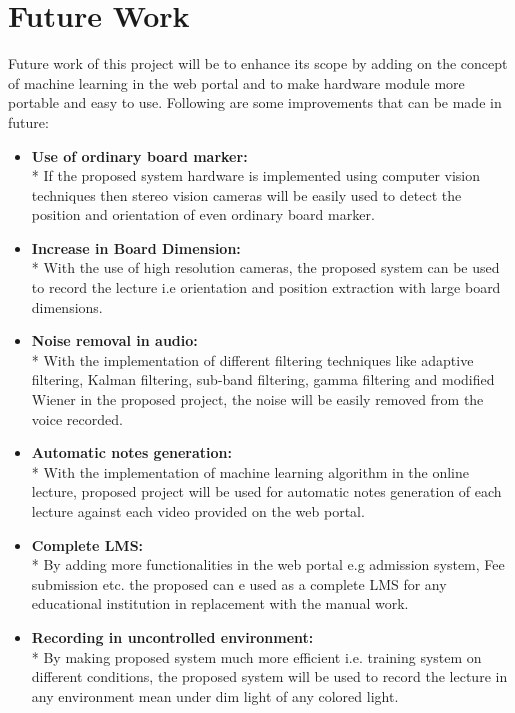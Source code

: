 
\chapter{Future Work} %
\label{Chapter7}

Future work of this project will be to enhance its scope by adding on the concept of machine learning in the web portal and to make hardware module more portable and easy to use. Following are some improvements that can be made in future:
\begin{itemize}

\item \textbf{Use of ordinary board marker:}\\*
If the proposed system hardware is implemented using computer vision techniques then stereo vision cameras will be easily used to detect the position and orientation of even ordinary board marker.

\item \textbf{Increase in Board Dimension:}\\*
With the use of high resolution cameras, the proposed system can be used to record the lecture i.e orientation and position extraction with large board dimensions.

\item \textbf{Noise removal in audio:}\\*
With the implementation of different filtering techniques like adaptive filtering, Kalman filtering, sub-band filtering, gamma filtering and modified Wiener in the proposed project, the noise will be easily removed from the voice recorded.

\item \textbf{Automatic notes generation:}\\*
With the implementation of machine learning algorithm in the online lecture, proposed project will be used for automatic notes generation of each lecture against each video provided on the web portal.

\item \textbf{Complete LMS:}\\*
By adding more functionalities in the web portal e.g admission system, Fee submission etc. the proposed can e used as a complete LMS for any educational institution in replacement with the manual work. 

\item \textbf{Recording in uncontrolled environment:}\\*
By making proposed system much more efficient i.e. training system on different conditions, the proposed system will be used to record the lecture in any environment mean under dim light of any colored light.


\end{itemize}
